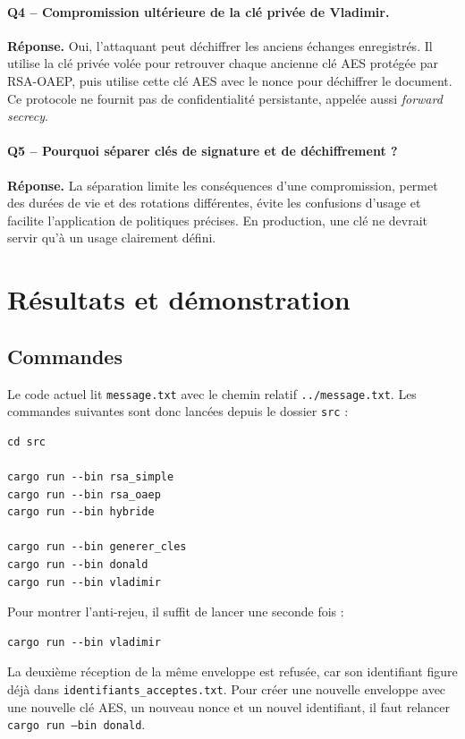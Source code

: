 \documentclass[11pt,a4paper]{article}
\newcommand{\fichier}[1]{\texttt{#1}}
\newcommand{\commande}[1]{\texttt{#1}}
\newcommand{\reponse}{\textbf{Réponse.} }
\begin{document}
\paragraph{Q4 -- Compromission ultérieure de la clé privée de Vladimir.}
\reponse Oui, l'attaquant peut déchiffrer les anciens échanges enregistrés. Il utilise la
clé privée volée pour retrouver chaque ancienne clé AES protégée par RSA-OAEP, puis
utilise cette clé AES avec le nonce pour déchiffrer le document. Ce protocole ne fournit
pas de confidentialité persistante, appelée aussi \emph{forward secrecy}.

\paragraph{Q5 -- Pourquoi séparer clés de signature et de déchiffrement ?}
\reponse La séparation limite les conséquences d'une compromission, permet des
durées de vie et des rotations différentes, évite les confusions d'usage et facilite
l'application de politiques précises. En production, une clé ne devrait servir qu'à un
usage clairement défini.

\section{Résultats et démonstration}

\subsection{Commandes}

Le code actuel lit \fichier{message.txt} avec le chemin relatif
\texttt{../message.txt}. Les commandes suivantes sont donc lancées depuis le dossier
\fichier{src} :

\begin{verbatim}
cd src

cargo run --bin rsa_simple
cargo run --bin rsa_oaep
cargo run --bin hybride

cargo run --bin generer_cles
cargo run --bin donald
cargo run --bin vladimir
\end{verbatim}

Pour montrer l'anti-rejeu, il suffit de lancer une seconde fois :

\begin{verbatim}
cargo run --bin vladimir
\end{verbatim}

La deuxième réception de la même enveloppe est refusée, car son identifiant figure déjà
dans \fichier{identifiants\_acceptes.txt}. Pour créer une nouvelle enveloppe avec une
nouvelle clé AES, un nouveau nonce et un nouvel identifiant, il faut relancer
\commande{cargo run --bin donald}.
\end{document}
